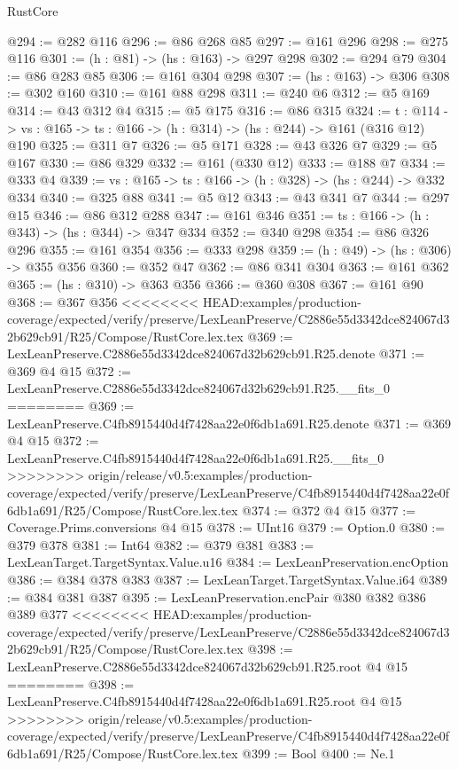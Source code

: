 \begin{lexlean}{RustCore}
\begin{coremodule}
{\begin{coremodule}
@294 := @282 @116
@296 := @86 @268 @85
@297 := @161 @296
@298 := @275 @116
@301 := (h : @81) -> (hs : @163) -> @297 @298
@302 := @294 @79
@304 := @86 @283 @85
@306 := @161 @304 @298
@307 := (hs : @163) -> @306
@308 := @302 @160
@310 := @161 @88 @298
@311 := @240 @6
@312 := @5 @169
@314 := @43 @312 @4
@315 := @5 @175
@316 := @86 @315
@324 := {t : @114} ->
  {vs : @165} -> {ts : @166} -> (h : @314) -> (hs : @244) -> @161 (@316 @12) @190
@325 := @311 @7
@326 := @5 @171
@328 := @43 @326 @7
@329 := @5 @167
@330 := @86 @329
@332 := @161 (@330 @12)
@333 := @188 @7
@334 := @333 @4
@339 := {vs : @165} -> {ts : @166} -> (h : @328) -> (hs : @244) -> @332 @334
@340 := @325 @88
@341 := @5 @12
@343 := @43 @341 @7
@344 := @297 @15
@346 := @86 @312 @288
@347 := @161 @346
@351 := {ts : @166} -> (h : @343) -> (hs : @344) -> @347 @334
@352 := @340 @298
@354 := @86 @326 @296
@355 := @161 @354
@356 := @333 @298
@359 := (h : @49) -> (hs : @306) -> @355 @356
@360 := @352 @47
@362 := @86 @341 @304
@363 := @161 @362
@365 := (hs : @310) -> @363 @356
@366 := @360 @308
@367 := @161 @90
@368 := @367 @356
<<<<<<<< HEAD:examples/production-coverage/expected/verify/preserve/LexLeanPreserve/C2886e55d3342dce824067d32b629cb91/R25/Compose/RustCore.lex.tex
@369 := LexLeanPreserve.C2886e55d3342dce824067d32b629cb91.R25.denote
@371 := @369 @4 @15
@372 := LexLeanPreserve.C2886e55d3342dce824067d32b629cb91.R25.__fits_0
========
@369 := LexLeanPreserve.C4fb8915440d4f7428aa22e0f6db1a691.R25.denote
@371 := @369 @4 @15
@372 := LexLeanPreserve.C4fb8915440d4f7428aa22e0f6db1a691.R25.__fits_0
>>>>>>>> origin/release/v0.5:examples/production-coverage/expected/verify/preserve/LexLeanPreserve/C4fb8915440d4f7428aa22e0f6db1a691/R25/Compose/RustCore.lex.tex
@374 := @372 @4 @15
@377 := Coverage.Prims.conversions @4 @15
@378 := UInt16
@379 := Option.{0}
@380 := @379 @378
@381 := Int64
@382 := @379 @381
@383 := LexLeanTarget.TargetSyntax.Value.u16
@384 := LexLeanPreservation.encOption
@386 := @384 @378 @383
@387 := LexLeanTarget.TargetSyntax.Value.i64
@389 := @384 @381 @387
@395 := LexLeanPreservation.encPair @380 @382 @386 @389 @377
<<<<<<<< HEAD:examples/production-coverage/expected/verify/preserve/LexLeanPreserve/C2886e55d3342dce824067d32b629cb91/R25/Compose/RustCore.lex.tex
@398 := LexLeanPreserve.C2886e55d3342dce824067d32b629cb91.R25.root @4 @15
========
@398 := LexLeanPreserve.C4fb8915440d4f7428aa22e0f6db1a691.R25.root @4 @15
>>>>>>>> origin/release/v0.5:examples/production-coverage/expected/verify/preserve/LexLeanPreserve/C4fb8915440d4f7428aa22e0f6db1a691/R25/Compose/RustCore.lex.tex
@399 := Bool
@400 := Ne.{1}

\end{coremodule}}
\end{coremodule}
\end{lexlean}
